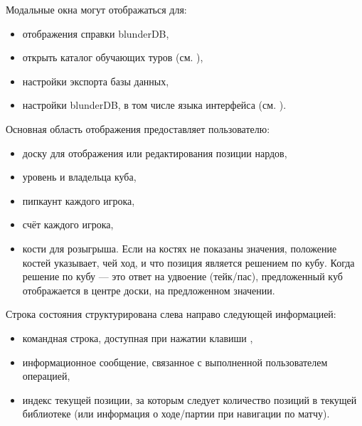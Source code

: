\documentclass[letterpaper,10pt,russian]{sphinxmanual}
\begin{document}
\sphinxAtStartPar
Модальные окна могут отображаться для:
\begin{itemize}
\item {} 
\sphinxAtStartPar
отображения справки blunderDB,

\item {} 
\sphinxAtStartPar
открыть каталог обучающих туров (см. {\hyperref[\detokenize{manuel:visites-guidees}]{}}),

\item {} 
\sphinxAtStartPar
настройки экспорта базы данных,

\item {} 
\sphinxAtStartPar
настройки blunderDB, в том числе языка интерфейса (см. {\hyperref[\detokenize{manuel:configuration}]{}}).

\end{itemize}

\sphinxAtStartPar
Основная область отображения предоставляет пользователю:
\begin{itemize}
\item {} 
\sphinxAtStartPar
доску для отображения или редактирования позиции нардов,

\item {} 
\sphinxAtStartPar
уровень и владельца куба,

\item {} 
\sphinxAtStartPar
пипкаунт каждого игрока,

\item {} 
\sphinxAtStartPar
счёт каждого игрока,

\item {} 
\sphinxAtStartPar
кости для розыгрыша. Если на костях не показаны значения, положение костей указывает, чей ход, и что позиция является решением по кубу. Когда решение по кубу — это ответ на удвоение (тейк/пас), предложенный куб отображается в центре доски, на предложенном значении.

\end{itemize}

\sphinxAtStartPar
Строка состояния структурирована слева направо следующей информацией:
\begin{itemize}
\item {} 
\sphinxAtStartPar
командная строка, доступная при нажатии клавиши ,

\item {} 
\sphinxAtStartPar
информационное сообщение, связанное с выполненной пользователем операцией,

\item {} 
\sphinxAtStartPar
индекс текущей позиции, за которым следует количество позиций в текущей библиотеке (или информация о ходе/партии при навигации по матчу).

\end{itemize}
\end{document}
